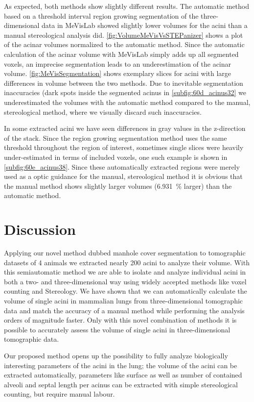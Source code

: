 \documentclass[%
	twoside,
	paper=a4,%
	abstract=true,%
	]{scrartcl}
\newcommand{\difference}{6.931}
\begin{document}
As expected, both methods show slightly different results. The automatic method based on a threshold interval region growing segmentation of the three-dimensional data in MeVisLab showed slightly lower volumes for the acini than a manual stereological analysis did. \autoref{fig:VolumeMeVisVsSTEPanizer} shows a plot of the acinar volumes normalized to the automatic method. Since the automatic calculation of the acinar volume with MeVisLab simply adds up all segmented voxels, an imprecise segmentation leads to an underestimation of the acinar volume. \autoref{fig:MeVisSegmentation} shows exemplary slices for acini with large differences in volume between the two methods. Due to inevitable segmentation inaccuracies (dark spots inside the segmented acinus in \autoref{subfig:60d_acinus32} we underestimated the volumes with the automatic method compared to the manual, stereological method, where we visually discard such inaccuracies.

In some extracted acini we have seen differences in gray values in the z-direction of the stack. Since the region growing segmentation method uses the same threshold throughout the region of interest, sometimes single slices were heavily under-estimated in terms of included voxels, one such example is shown in \autoref{subfig:60e_acinus38}. Since these automatically extracted regions were merely used as a optic guidance for the manual, stereological method it is obvious that the manual method shows slightly larger volumes (\SI{\difference}{\percent} larger) than the automatic method.

\section{Discussion}
Applying our novel method dubbed manhole cover segmentation to tomographic datasets of 4 animals we extracted nearly 200 acini to analyze their volume. With this semiautomatic method we are able to isolate and analyze individual acini in both a two- and three-dimensional way using widely accepted methods like voxel counting and Stereology. We have shown that we can automatically calculate the volume of single acini in mammalian lungs from three-dimensional tomographic data and match the accuracy of a manual method while performing the analysis orders of magnitude faster. Only with this novel combination of methods it is possible to accurately assess the volume of single acini in three-dimensional tomographic data.

Our proposed method opens up the possibility to fully analyze biologically interesting parameters of the acini in the lung; the volume of the acini can be extracted automatically, parameters like surface as well as number of contained alveoli and septal length per acinus can be extracted with simple stereological counting, but require manual labour. 
\end{document}

